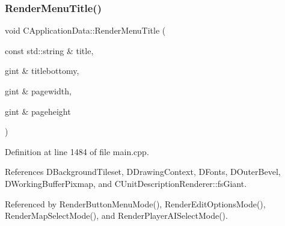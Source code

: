 \hypertarget{classCApplicationData_a548c5924a281c7e226fd7cac44e59920}{}\label{classCApplicationData_a548c5924a281c7e226fd7cac44e59920} 
\subsubsection{\texorpdfstring{Render\+Menu\+Title()}{RenderMenuTitle()}}
{\footnotesize\ttfamily void C\+Application\+Data\+::\+Render\+Menu\+Title (\begin{DoxyParamCaption}\item[{const std\+::string \&}]{title,  }\item[{gint \&}]{titlebottomy,  }\item[{gint \&}]{pagewidth,  }\item[{gint \&}]{pageheight }\end{DoxyParamCaption})\hspace{0.3cm}{\ttfamily [protected]}}



Definition at line 1484 of file main.\+cpp.



References D\+Background\+Tileset, D\+Drawing\+Context, D\+Fonts, D\+Outer\+Bevel, D\+Working\+Buffer\+Pixmap, and C\+Unit\+Description\+Renderer\+::fs\+Giant.



Referenced by Render\+Button\+Menu\+Mode(), Render\+Edit\+Options\+Mode(), Render\+Map\+Select\+Mode(), and Render\+Player\+A\+I\+Select\+Mode().



